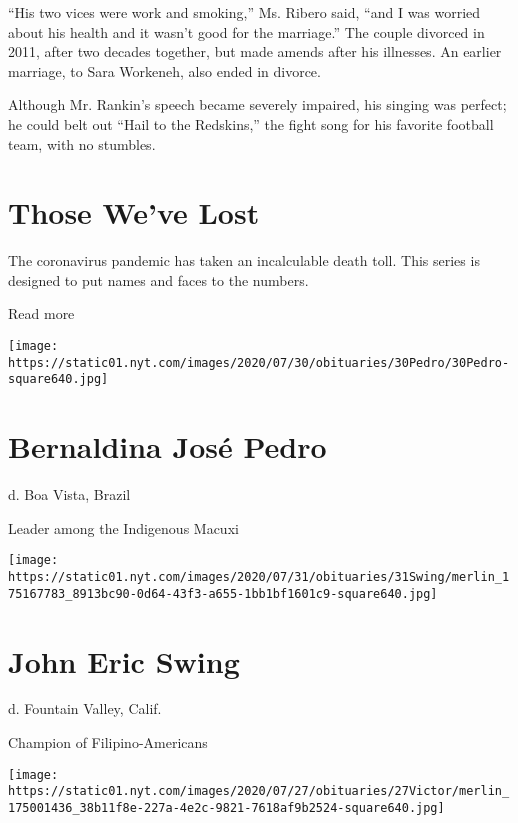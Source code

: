 ``His two vices were work and smoking,'' Ms. Ribero said, ``and I was
worried about his health and it wasn't good for the marriage.'' The
couple divorced in 2011, after two decades together, but made amends
after his illnesses. An earlier marriage, to Sara Workeneh, also ended
in divorce.

Although Mr. Rankin's speech became severely impaired, his singing was
perfect; he could belt out ``Hail to the Redskins,'' the fight song for
his favorite football team, with no stumbles.

\href{https://www.nytimes.com/interactive/2020/obituaries/people-died-coronavirus-obituaries.html?action=click\&pgtype=Article\&state=default\&region=BELOW_MAIN_CONTENT\&context=covid_obits_promo}{}

\hypertarget{those-weve-lost}{%
\section{Those We've Lost}\label{those-weve-lost}}

The coronavirus pandemic has taken an incalculable death toll. This
series is designed to put names and faces to the numbers.

Read more

\texttt{[image: https://static01.nyt.com/images/2020/07/30/obituaries/30Pedro/30Pedro-square640.jpg]}

\hypertarget{bernaldina-josuxe9-pedro}{%
\section{Bernaldina José Pedro}\label{bernaldina-josuxe9-pedro}}

d. Boa Vista, Brazil

Leader among the Indigenous Macuxi

\texttt{[image: https://static01.nyt.com/images/2020/07/31/obituaries/31Swing/merlin\_175167783\_8913bc90-0d64-43f3-a655-1bb1bf1601c9-square640.jpg]}

\hypertarget{john-eric-swing}{%
\section{John Eric Swing}\label{john-eric-swing}}

d. Fountain Valley, Calif.

Champion of Filipino-Americans

\texttt{[image: https://static01.nyt.com/images/2020/07/27/obituaries/27Victor/merlin\_175001436\_38b11f8e-227a-4e2c-9821-7618af9b2524-square640.jpg]}

